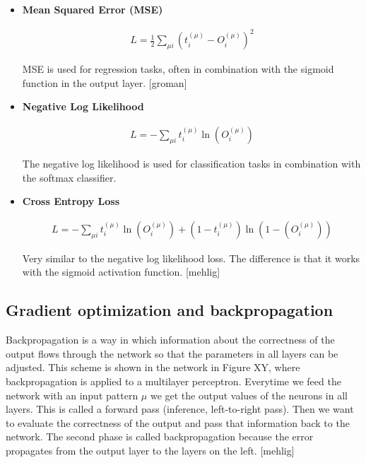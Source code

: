 \begin{itemize}
\item \textbf{Mean Squared Error (MSE)}

\begin{gather}
	L =  \frac{1}{2} \sum\limits_{\mu i} \left( t_{i}^{(\mu)} - O_{i}^{(\mu)} \right)^2
\end{gather}

MSE is used for regression tasks, often in combination with the sigmoid function in the output layer. [groman]

\item \textbf{Negative Log Likelihood} 

\begin{gather}
	L = - \sum\limits_{\mu i}  t_{i}^{(\mu)} \ln (O_{i}^{(\mu)})
\end{gather}

The negative log likelihood is used for classification tasks in combination with the softmax classifier.

\item \textbf{Cross Entropy Loss} 

\begin{gather}
	L = - \sum\limits_{\mu i}  t_{i}^{(\mu)} \ln (O_{i}^{(\mu)}) + (1 - t_{i}^{(\mu)}) \ln (1 - (O_{i}^{(\mu)}))
\end{gather}

Very similar to the negative log likelihood loss. The difference is that it works with the sigmoid activation function. [mehlig]

\end{itemize}  

\subsection{Gradient optimization and backpropagation}

Backpropagation is a way in which information about the correctness of the output flows through the network so that the parameters in all layers can be adjusted. This scheme is shown in the network in Figure XY, where backpropagation is applied to a multilayer perceptron. Everytime we feed the network with an input pattern $ \mu $ we get the output values of the neurons in all layers. This is called a forward pass (inference, left-to-right pass). Then we want to evaluate the correctness of the output and pass that information back to the network. The second phase is called backpropagation because the error propagates from the output layer to the layers on the left. [mehlig]  

